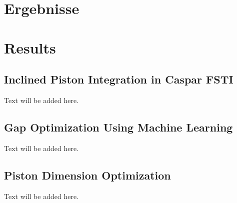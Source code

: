 {\chapter{Ergebnisse}}
{\chapter{Results}}
\label{sec:methods}

\section{Inclined Piston Integration in Caspar FSTI}
Text will be added here.

\section{Gap Optimization Using Machine Learning}
Text will be added here.

\section{Piston Dimension Optimization}
Text will be added here.
